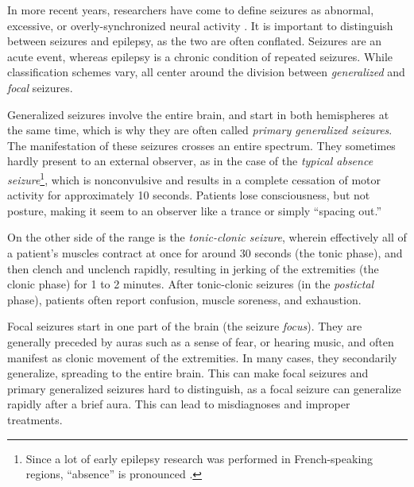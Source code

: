 In more recent years, researchers have come to define seizures as abnormal, excessive, or overly-synchronized neural activity \cite{Kandel2013,Baier2012}.
It is important to distinguish between seizures and epilepsy, as the two are often conflated.
Seizures are an acute event, whereas epilepsy is a chronic condition of repeated seizures.
While classification schemes vary, all center around the division between \textit{generalized} and \textit{focal} seizures.

Generalized seizures involve the entire brain, and start in both hemispheres at the same time, which is why they are often called \textit{primary generalized seizures}.
The manifestation of these seizures crosses an entire spectrum.
They sometimes hardly present to an external observer, as in the case of the \textit{typical absence seizure}\footnote{Since a lot of early epilepsy research was performed in French-speaking regions, ``absence'' is pronounced .}, which is nonconvulsive and results in a complete cessation of motor activity for approximately 10 seconds.
Patients lose consciousness, but not posture, making it seem to an observer like a trance or simply ``spacing out.''

On the other side of the range is the \textit{tonic-clonic seizure}, wherein effectively all of a patient's muscles contract at once for around 30 seconds (the tonic phase), and then clench and unclench rapidly, resulting in jerking of the extremities (the clonic phase) for 1 to 2 minutes.
After tonic-clonic seizures (in the \textit{postictal} phase), patients often report confusion, muscle soreness, and exhaustion.

Focal seizures start in one part of the brain (the seizure \textit{focus}).
They are generally preceded by auras such as a sense of fear, or hearing music, and often manifest as clonic movement of the extremities.
In many cases, they secondarily generalize, spreading to the entire brain.
This can make focal seizures and primary generalized seizures hard to distinguish, as a focal seizure can generalize rapidly after a brief aura.
This can lead to misdiagnoses and improper treatments.

